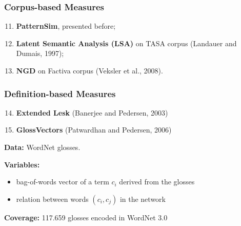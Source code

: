 \documentclass{beamer}
\begin{document}
 
 


	

	

\begin{frame}
\frametitle{Corpus-based Measures }

\begin{enumerate}
   \setcounter{enumi}{10}
   \item \textbf{PatternSim}, presented before;
	\item \textbf{Latent Semantic Analysis (LSA)} on TASA corpus (Landauer and Dumais, 1997);
	\item \textbf{NGD} on Factiva corpus (Veksler et al., 2008).
\end{enumerate}
	
\end{frame}

\begin{frame}
\frametitle{Definition-based Measures}

\begin{enumerate}
  \setcounter{enumi}{13}
  \item \textbf{Extended Lesk}  (Banerjee and Pedersen, 2003)
  \item \textbf{GlossVectors} (Patwardhan and Pedersen, 2006)
\end{enumerate}


\textbf{Data:} WordNet glosses.
	
\textbf{Variables:}
\begin{itemize}
		\item bag-of-words vector of a term $c_i$ derived from the glosses
		\item relation  between words $(c_i,c_j)$ in the network 
\end{itemize}

\textbf{Coverage:} 117.659 glosses encoded in WordNet 3.0

\end{frame}
\end{document}
